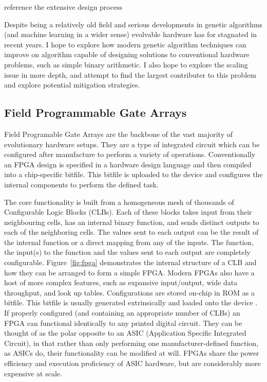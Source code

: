 \todo reference the extensive design process

Despite being a relatively old field and serious developments in genetic
algorithms (and machine learning in a wider sense) evolvable hardware has for
stagnated in recent years. I hope to explore how modern
genetic algorithm techniques can improve on algorithm capable of designing solutions
to conventional hardware problems, such as simple binary arithmetic.
I also hope to explore the scaling issue in more depth, and attempt to find
the largest contributer to this problem and explore potential mitigation
strategies.

\subsection{Field Programmable Gate Arrays \label{ss:FPGAs}}
Field Programable Gate Arrays \cite{Kuon:2008:FAS:1454695.1454696}
are the backbone of the vast majority of evolutionary
hardware setups. They are a type of integrated circuit which can be
configured after manufacture to perform a variety of operations. Conventionally
an FPGA design is specified in a hardware design language and then compiled into a chip-specific bitfile.
This bitfile is uploaded to the device and configures the internal components
to perform the defined task.

The core functionality is built from a homogeneous mesh of
thousands of Configurable Logic Blocks (CLBs).
Each of these blocks takes input from their
neighbouring cells, has an internal binary function, and sends distinct outputs
to each of the neighboring cells. The values sent to each output can be the
result of the internal function or a direct mapping from any of the inputs. The function,
the input(s) to the function
and the values sent to each output are completely configurable. Figure~\ref{fig:fpga}
demonstrates the internal structure of a CLB and how they can be arranged to form a simple FPGA.
Modern FPGAs also have a host of more complex features, such as expansive input/output,
wide data throughput, and look up tables.
Configurations are stored on-chip in ROM as a bitfile. This bitfile is usually generated
extrinsically \cite{10.1007/978-3-540-46239-2_5} and loaded onto the device \cite{Kuon:2008:FAS:1454695.1454696}.
If properly configured (and containing an appropriate number of CLBs) an FPGA can
functional identically to any printed digital circuit. They can be thought of
as the polar opposite to an ASIC (Application Specific Integrated Circuit), in that
rather than only performing one manufacturer-defined function, as ASICs do,
their functionality can be modified at will.
FPGAs share the power efficiency and execution proficiency of ASIC hardware, but
are considerably more expensive at scale.

